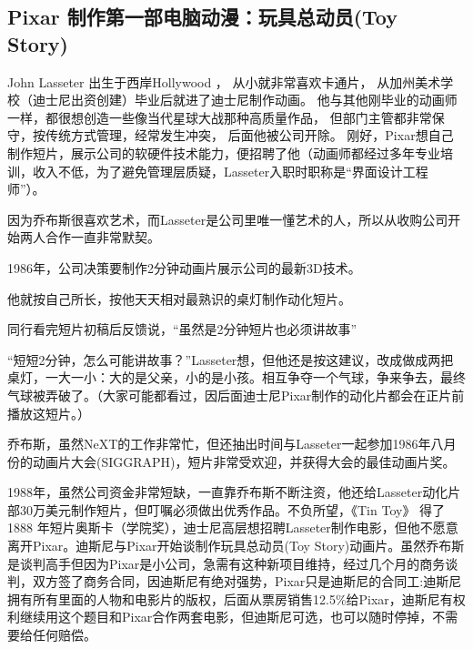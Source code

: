 \hypertarget{pixar-ux5236ux4f5cux7b2cux4e00ux90e8ux7535ux8111ux52a8ux6f2bux73a9ux5177ux603bux52a8ux5458toy-story}{%
\subsection{Pixar 制作第一部电脑动漫：玩具总动员(Toy
Story)}\label{pixar-ux5236ux4f5cux7b2cux4e00ux90e8ux7535ux8111ux52a8ux6f2bux73a9ux5177ux603bux52a8ux5458toy-story}}



John Lasseter 出生于西岸Hollywood ， 从小就非常喜欢卡通片，
从加州美术学校（迪士尼出资创建）毕业后就进了迪士尼制作动画。
他与其他刚毕业的动画师一样，都很想创造一些像当代星球大战那种高质量作品，
但部门主管都非常保守，按传统方式管理，经常发生冲突， 后面他被公司开除。
刚好，Pixar想自己制作短片，展示公司的软硬件技术能力，便招聘了他（动画师都经过多年专业培训，收入不低，为了避免管理层质疑，Lasseter入职时职称是``界面设计工程师''）。

因为乔布斯很喜欢艺术，而Lasseter是公司里唯一懂艺术的人，所以从收购公司开始两人合作一直非常默契。

1986年，公司决策要制作2分钟动画片展示公司的最新3D技术。

他就按自己所长，按他天天相对最熟识的桌灯制作动化短片。

同行看完短片初稿后反馈说，``虽然是2分钟短片也必须讲故事''

``短短2分钟，怎么可能讲故事？''Lasseter想，但他还是按这建议，改成做成两把桌灯，一大一小：大的是父亲，小的是小孩。相互争夺一个气球，争来争去，最终气球被弄破了。（大家可能都看过，因后面迪士尼Pixar制作的动化片都会在正片前播放这短片。）

乔布斯，虽然NeXT的工作非常忙，但还抽出时间与Lasseter一起参加1986年八月份的动画片大会(SIGGRAPH)，短片非常受欢迎，并获得大会的最佳动画片奖。


1988年，虽然公司资金非常短缺，一直靠乔布斯不断注资，他还给Lasseter动化片部30万美元制作短片，但叮嘱必须做出优秀作品。不负所望，《Tin Toy》
得了1888
年短片奥斯卡（学院奖），迪士尼高层想招聘Lasseter制作电影，但他不愿意离开Pixar。迪斯尼与Pixar开始谈制作玩具总动员(Toy
Story)动画片。虽然乔布斯是谈判高手但因为Pixar是小公司，急需有这种新项目维持，经过几个月的商务谈判，双方签了商务合同，因迪斯尼有绝对强势，Pixar只是迪斯尼的合同工:迪斯尼拥有所有里面的人物和电影片的版权，后面从票房销售12.5\%给Pixar，迪斯尼有权利继续用这个题目和Pixar合作两套电影，但迪斯尼可选，也可以随时停掉，不需要给任何赔偿。

